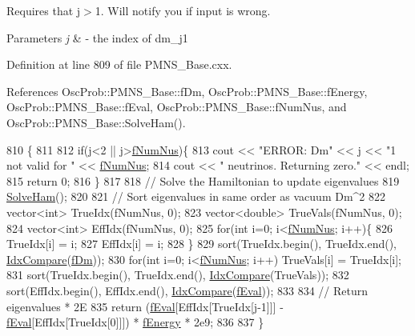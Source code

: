 Requires that j$>$1. Will notify you if input is wrong.


\begin{DoxyParams}{Parameters}
{\em j} & -\/ the index of dm\+\_\+j1 \\
\hline
\end{DoxyParams}


Definition at line 809 of file P\+M\+N\+S\+\_\+\+Base.\+cxx.



References Osc\+Prob\+::\+P\+M\+N\+S\+\_\+\+Base\+::f\+Dm, Osc\+Prob\+::\+P\+M\+N\+S\+\_\+\+Base\+::f\+Energy, Osc\+Prob\+::\+P\+M\+N\+S\+\_\+\+Base\+::f\+Eval, Osc\+Prob\+::\+P\+M\+N\+S\+\_\+\+Base\+::f\+Num\+Nus, and Osc\+Prob\+::\+P\+M\+N\+S\+\_\+\+Base\+::\+Solve\+Ham().


\begin{DoxyCode}
810 \{
811 
812   \textcolor{keywordflow}{if}(j<2 || j>\hyperlink{classOscProb_1_1PMNS__Base_a24bb74bed63569dfe88b18fa6a08060e}{fNumNus})\{
813     cout << \textcolor{stringliteral}{"ERROR: Dm"} << j << \textcolor{stringliteral}{"1 not valid for "} << \hyperlink{classOscProb_1_1PMNS__Base_a24bb74bed63569dfe88b18fa6a08060e}{fNumNus};
814     cout << \textcolor{stringliteral}{" neutrinos. Returning zero."} << endl;
815     \textcolor{keywordflow}{return} 0;
816   \}
817 
818   \textcolor{comment}{// Solve the Hamiltonian to update eigenvalues}
819   \hyperlink{classOscProb_1_1PMNS__Base_a91f065cb9e910e0095e41462b4420b01}{SolveHam}();
820   
821   \textcolor{comment}{// Sort eigenvalues in same order as vacuum Dm^2}
822   vector<int> TrueIdx(fNumNus, 0);
823   vector<double> TrueVals(fNumNus, 0);
824   vector<int> EffIdx(fNumNus, 0);
825   \textcolor{keywordflow}{for}(\textcolor{keywordtype}{int} i=0; i<\hyperlink{classOscProb_1_1PMNS__Base_a24bb74bed63569dfe88b18fa6a08060e}{fNumNus}; i++)\{
826     TrueIdx[i] = i;
827     EffIdx[i] = i;
828   \}
829   sort(TrueIdx.begin(), TrueIdx.end(), \hyperlink{structOscProb_1_1IdxCompare}{IdxCompare}(\hyperlink{classOscProb_1_1PMNS__Base_a406a31c3b5d620e5a0cace5b411f9f70}{fDm}));
830   \textcolor{keywordflow}{for}(\textcolor{keywordtype}{int} i=0; i<\hyperlink{classOscProb_1_1PMNS__Base_a24bb74bed63569dfe88b18fa6a08060e}{fNumNus}; i++) TrueVals[i] = TrueIdx[i];
831   sort(TrueIdx.begin(), TrueIdx.end(), \hyperlink{structOscProb_1_1IdxCompare}{IdxCompare}(TrueVals));
832   sort(EffIdx.begin(), EffIdx.end(), \hyperlink{structOscProb_1_1IdxCompare}{IdxCompare}(\hyperlink{classOscProb_1_1PMNS__Base_a6319c34d7decbb9d7d6da279c06e8c2d}{fEval}));
833 
834   \textcolor{comment}{// Return eigenvalues * 2E}
835   \textcolor{keywordflow}{return} (\hyperlink{classOscProb_1_1PMNS__Base_a6319c34d7decbb9d7d6da279c06e8c2d}{fEval}[EffIdx[TrueIdx[j-1]]] - \hyperlink{classOscProb_1_1PMNS__Base_a6319c34d7decbb9d7d6da279c06e8c2d}{fEval}[EffIdx[TrueIdx[0]]]) * 
      \hyperlink{classOscProb_1_1PMNS__Base_a2800af6d436972f3e900867790c046b0}{fEnergy} * 2e9;
836 
837 \}
\end{DoxyCode}
